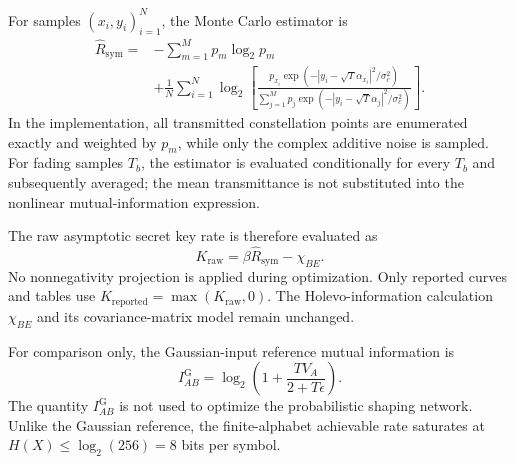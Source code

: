 For samples $(x_i,y_i)_{i=1}^{N}$, the Monte Carlo estimator is
\begin{align}
    \widehat{R}_{\mathrm{sym}}
    ={}&-\sum_{m=1}^{M}p_m\log_2 p_m \nonumber\\
    &+\frac{1}{N}\sum_{i=1}^{N}\log_2\!\left[
    \frac{p_{x_i}\exp\!\left(-|y_i-\sqrt{T}\alpha_{x_i}|^2/\sigma_c^2\right)}
    {\sum_{j=1}^{M}p_j\exp\!\left(-|y_i-\sqrt{T}\alpha_j|^2/\sigma_c^2\right)}
    \right].
\end{align}
In the implementation, all transmitted constellation points are enumerated
exactly and weighted by $p_m$, while only the complex additive noise is sampled.
For fading samples $T_b$, the estimator is evaluated conditionally for every
$T_b$ and subsequently averaged; the mean transmittance is not substituted into
the nonlinear mutual-information expression.

The raw asymptotic secret key rate is therefore evaluated as
\begin{equation}
    K_{\mathrm{raw}}=\beta\widehat{R}_{\mathrm{sym}}-\chi_{BE}.
\end{equation}
No nonnegativity projection is applied during optimization. Only reported
curves and tables use $K_{\mathrm{reported}}=\max(K_{\mathrm{raw}},0)$.
The Holevo-information calculation $\chi_{BE}$ and its covariance-matrix model
remain unchanged.

For comparison only, the Gaussian-input reference mutual information is
\begin{equation}
    I_{AB}^{\mathrm{G}}
    =\log_2\!\left(1+\frac{T V_A}{2+T\epsilon}\right).
\end{equation}
The quantity $I_{AB}^{\mathrm{G}}$ is not used to optimize the probabilistic
shaping network. Unlike the Gaussian reference, the finite-alphabet achievable
rate saturates at $H(X)\leq\log_2(256)=8$ bits per symbol.
